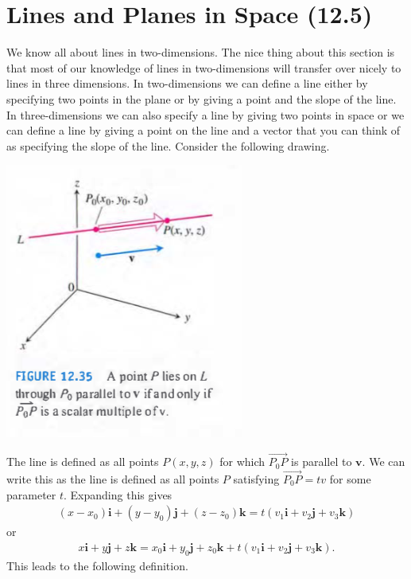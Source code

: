 \documentclass[12pt, letter]{article}
\theoremstyle{plain}
\numberwithin{theorem}{section}
\theoremstyle{definition}
\begin{document}
\section{Lines and Planes in Space (12.5)}

We know all about lines in two-dimensions. The nice thing about this section is that most of our knowledge of lines in two-dimensions will transfer over nicely to lines in three dimensions. In two-dimensions we can define a line either by specifying two points in the plane or by giving a point and the slope of the line. In three-dimensions we can also specify a line by giving two points in space or we can define a line by giving a point on the line and a vector that you can think of as specifying the slope of the line. Consider the following drawing.

\bigskip

\begin{center}
\includegraphics[scale=0.7]{m1_f17}
\end{center}

\bigskip

The line is defined as all points $P(x,y,z)$ for which $\vec{P_0P}$ is parallel to $\bm{v}$. We can write this as the line is defined as all points $P$ satisfying $\vec{P_0P} = tv$ for some parameter $t$. Expanding this gives
\begin{align*}
(x-x_0)\bm{i}+(y-y_0)\bm{j}+(z-z_0)\bm{k} = t(v_1\bm{i}+v_2\bm{j}+v_3\bm{k})
\end{align*}
or
\begin{align*}
x\bm{i}+y\bm{j}+z\bm{k} = x_0\bm{i} + y_0\bm{j}+z_0\bm{k}+ t(v_1\bm{i}+v_2\bm{j}+v_3\bm{k}).
\end{align*}
This leads to the following definition.
\end{document}
